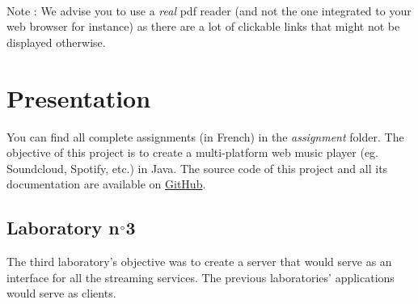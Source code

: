 \documentclass{report}
\begin{document}
\ \\

Note : We advise you to use a \textit{real} pdf reader (and not the one integrated to your web browser for instance) as there are a lot of clickable links that might not be displayed otherwise.
\chapter{Presentation}

You can find all complete assignments (in French) in the \textit{assignment} folder. The objective of this project is to create a multi-platform web music player (eg. Soundcloud, Spotify, etc.) in Java. The source code of this project and all its documentation are available on \href{https://github.com/cnamal/arch-LOG8430}{GitHub}.



\section{Laboratory n$\degree$3}
The third laboratory's objective was to create a server that would serve as an interface for all the streaming services. The previous laboratories' applications would serve as clients.
\end{document}
